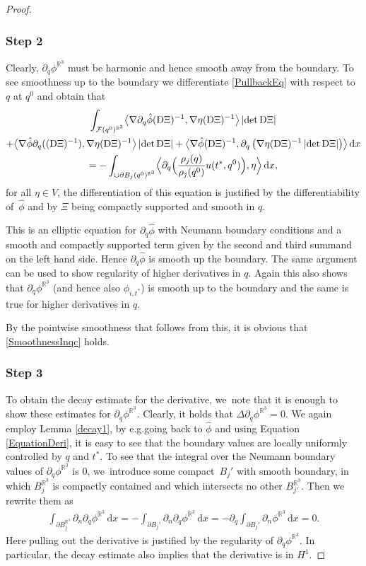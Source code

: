 \documentclass[10pt]{amsart}
\newcommand{\eg}{e.g.}
\theoremstyle{definition}
\newcommand\R{\mathbb{R}}
\newcommand\bscalar[2]{\bigl\langle #1,#2\bigr\rangle}
\newcommand\Bscalar[2]{\Bigl\langle #1,#2\Bigr\rangle}
\newcommand\eq{=}
\newcommand\dd{\,\mathrm{d}}
\newcommand\dx{\dd x}
\let\de\partial
\begin{document}
\begin{proof}
\subsubsection*{Step 2} Clearly, $\de_q \phi^{\R^3}$ must be harmonic and hence smooth away from the boundary. To see smoothness up to the boundary we differentiate \eqref{PullbackEq} with respect to $q$ at $q^0$ and obtain that
\begin{multline}
\int_{\mathcal{F}(q^0)^{\R^3}}\bscalar{\nabla\de_q\hat{\phi}(\text{D}\Xi)^{-1}}{\nabla\eta(\text{D}\Xi)^{-1}}\,|{\det \mathrm{D}\Xi}|\\
+\bscalar{\nabla\hat{\phi}\de_q((\text{D}\Xi)^{-1})}{\nabla\eta(\text{D}\Xi)^{-1}}\,|{\det \text{D}\Xi}|
+ \bscalar{\nabla\hat{\phi}(\text{D}\Xi)^{-1}}{\de_q\left(\nabla\eta(\text{D}\Xi)^{-1}\,|{\det \text{D}\Xi}|\right)}\dx\label{EquationDeri}\\
\eq-\int_{\cup \de B_j(q^0)^{\R^3} }\Bscalar{\de_q\Bigl(\frac{\rho_j(q)}{\rho_j(q^0)}u(t^*,q^0)\Bigr)}{\eta}\dx,
\end{multline}
for all $\eta\in V$, the differentiation of this equation is justified by the differentiability of~$\hat{\phi}$ and by $\Xi$ being compactly supported and smooth in $q$.

This is an elliptic equation for $\de_q\hat{\phi}$ with Neumann boundary conditions and a smooth and compactly supported term given by the second and third summand on the left hand side. Hence $\de_q\hat{\phi}$ is smooth up the boundary. The same argument can be used to show regularity of higher derivatives in $q$. Again this also shows that $\de_q\phi^{\R^3}$ (and hence also $\phi_{i,t^*}$) is smooth up to the boundary and the same is true for higher derivatives in $q$.

By the pointwise smoothness that follows from this, it is obvious that \eqref{SmoothnessInqc} holds.

\subsubsection*{Step 3} To obtain the decay estimate for the derivative, we~note that it is enough to show these estimates for $\de_q\phi^{\R^3}$. Clearly, it holds that $\Delta\de_q\phi^{\R^3}=0$.
We again employ Lemma \ref{decay1}, by \eg going back to $\hat{\phi}$ and using Equation \eqref{EquationDeri}, it is easy to see that the boundary values are locally uniformly controlled by $q$ and $t^*$. To see that the integral over the Neumann boundary values of $\de_q\phi^{\R^3}$ is $0$, we~introduce some compact~$B_j'$ with smooth boundary, in which $B_j^{\R^3}$ is compactly contained and which intersects no other $B_{j'}^{\R^3}$. Then we rewrite them as
\begin{align*}
\int_{\de B_j^{\R^3}}\de_n\de_q\phi^{\R^3}\dx\eq -\int_{\de B_j'}\de_n\de_q\phi^{\R^3}\dx\eq-\de_q\int_{\de B_j'}\de_n\phi^{\R^3}\dx\eq0.
\end{align*}
Here pulling out the derivative is justified by the regularity of $\de_q\phi^{\R^3}$.
In particular, the decay estimate also implies that the derivative is in $H^1$.
\end{proof}
\end{document}
